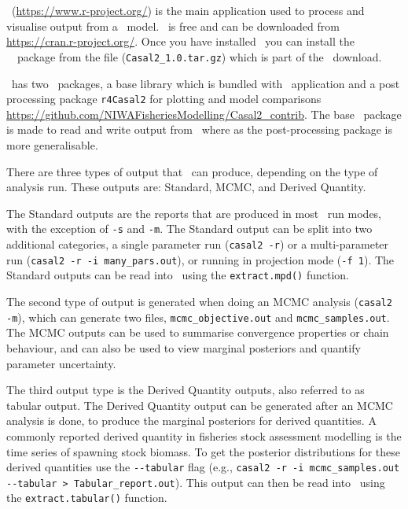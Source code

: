 \section{ \label{sec:PostProcessing}}

\R\ (\url{https://www.r-project.org/}) is the main application used to process and visualise output from a \CNAME\ model. \R\ is free and can be downloaded from \url{https://cran.r-project.org/}. Once you have installed \R\ you can install the \cname\ \R\ package from the file (\texttt{Casal2\_1.0.tar.gz}) which is part of the \CNAME\ download.

\CNAME\ has two \R\ packages, a base library which is bundled with \CNAME\ application and a post processing package \texttt{r4Casal2} for plotting and model comparisons \url{https://github.com/NIWAFisheriesModelling/Casal2_contrib}. The base \R\ package is made to read and write output from \CNAME\ where as the post-processing package is more generalisable. 

There are three types of output that \CNAME\ can produce, depending on the type of analysis run. These outputs are: Standard, MCMC, and Derived Quantity.

The Standard outputs are the reports that are produced in most \CNAME\ run modes, with the exception of \texttt{-s} and \texttt{-m}. The Standard output can be split into two additional categories, a single parameter run (\texttt{casal2 -r}) or a multi-parameter run (\texttt{casal2 -r -i many\_pars.out}), or running in projection mode (\texttt{-f 1}). The Standard outputs can be read into \R\ using the \texttt{extract.mpd()} function.

The second type of output is generated when doing an MCMC analysis (\texttt{casal2 -m}), which can generate two files, \texttt{mcmc\_objective.out} and \texttt{mcmc\_samples.out}. The MCMC outputs can be used to summarise convergence properties or chain behaviour, and can also be used to view marginal posteriors and quantify parameter uncertainty.

The third output type is the Derived Quantity outputs, also referred to as tabular output. The Derived Quantity output can be generated after an MCMC analysis is done, to produce the marginal posteriors for derived quantities. A commonly reported derived quantity in fisheries stock assessment modelling is the time series of spawning stock biomass. To get the posterior distributions for these derived quantities use the \texttt{-{}-tabular} flag (e.g., \texttt{casal2 -r -i mcmc\_samples.out -{}-tabular > Tabular\_report.out}). This output can then be read into \R\ using the \texttt{extract.tabular()} function.

